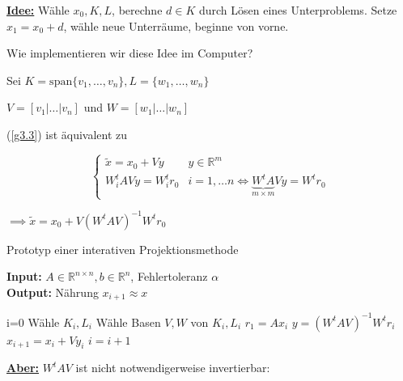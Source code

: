 \documentclass{book}
\def\R{\mathbb{R}}
\begin{document}
            \underline{\textbf{Idee:}} Wähle $x_0,K,L$, berechne $d\in K$ durch Lösen eines Unterproblems. Setze 
            $x_1=x_0+d$, wähle neue Unterräume, beginne von vorne.

            Wie implementieren wir diese Idee im Computer?

            Sei $K=\text{span}\{v_1, \dots, v_n\},L=\{w_1,\dots,w_n\}$

            $V=[v_1\vert \dots\vert v_n]$ und $W=[w_1\vert \dots\vert w_n]$

            (\ref{g3.3}) ist äquivalent zu 

            \begin{equation}\label{g3.4}
                \begin{cases}
                    \tilde{x} = x_0+Vy &  y\in\R^m\\
                    W_i^t A Vy = W_i^t r_0 & i=1,\dots n \iff \underbrace{W^tA}_{m\times m}Vy = W^tr_0
                \end{cases}
            \end{equation}

            $\implies \tilde{x}=x_0+V(W^tAV)^{-1}W^t r_0$ %

            \begin{algorithm}[H]\label{a3.2}
                \caption{Prototyp einer interativen Projektionsmethode}
                \textbf{Input:} $A\in\R^{n\times n},b\in\R^n$, Fehlertoleranz $\alpha$\\
                \textbf{Output:} Nährung $x_{i+1}\approx x$
                \begin{algorithmic}
                \State i=0
                    \State Wähle $K_i,L_i$
                    \State Wähle Basen $V,W$ von $K_i,L_i$
                    \State $r_1=Ax_i$
                    \State $y=(W^tAV)^{-1}W^tr_i$
                    \State $x_{i+1}=x_i+Vy_i$
                    \State $i=i+1$
                \EndWhile
                \end{algorithmic}
            \end{algorithm}

            \underline{\textbf{Aber:}} $W^tAV$ ist nicht notwendigerweise invertierbar:
\end{document}
